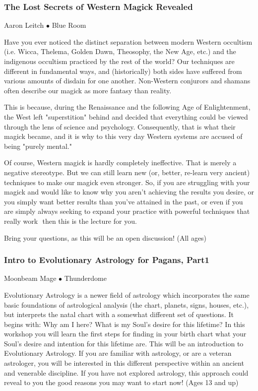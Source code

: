 \subsubsection{The Lost Secrets of Western Magick Revealed}
\label{Fri-Leitch2}
{\small Aaron Leitch $\bullet$  Blue Room}

 Have you ever noticed the distinct separation between modern Western occultism (i.e. Wicca, Thelema, Golden Dawn, Theosophy, the New Age, etc.) and the indigenous occultism practiced by the rest of the world? Our techniques are different in fundamental ways, and (historically) both sides have suffered from various amounts of disdain for one another.  Non-Western conjurors and shamans often describe our magick as more fantasy than reality.

This is because, during the Renaissance and the following Age of Enlightenment, the West left "superstition" behind and decided that everything could be viewed through the lens of science and psychology. Consequently, that is what their magick became, and it is why to this very day Western systems are accused of being "purely mental."

Of course, Western magick is hardly completely ineffective. That is merely a negative stereotype. But we can still learn new (or, better, re-learn very ancient) techniques to make our magick even stronger.  So, if you are struggling with your magick and would like to know why you aren't achieving the results you desire, or you simply want better results than you've attained in the past, or even if you are simply always seeking to expand your practice with powerful techniques that really work  then this is the lecture for you.

Bring your questions, as this will be an open discussion! {\small (All ages)}

\subsubsection{Intro to Evolutionary Astrology for Pagans, Part1}
\label{Fri-Mage2}
{\small Moonbeam Mage $\bullet$  Thunderdome}

 Evolutionary Astrology is a newer field of astrology which incorporates the same basic foundations of astrological analysis (the chart, planets, signs, houses, etc.), but interprets the natal chart with a somewhat different set of questions. It begins with: Why am I here? What is my Soul's desire for this lifetime? In this workshop you will learn the first steps for finding in your birth chart what your Soul's desire and intention for this lifetime are. This will be an introduction to Evolutionary Astrology. If you are familiar with astrology, or are a veteran astrologer, you will be interested in this different perspective within an ancient and venerable discipline. If you have not explored astrology, this approach could reveal to you the good reasons you may want to start now! {\small (Ages 13 and up)}

